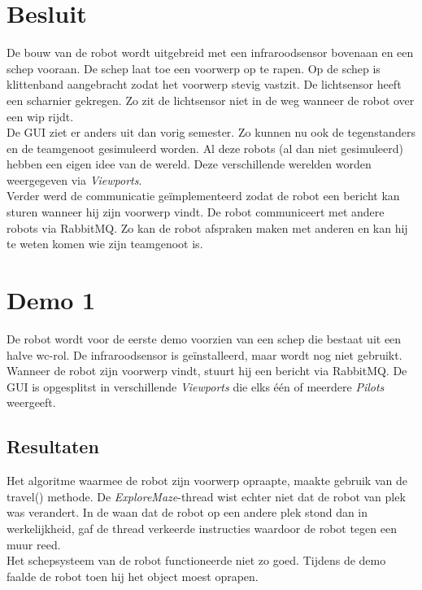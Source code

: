 \documentclass[tt2]{penoverslag}
\begin{document}
\section{Besluit}
De bouw van de robot wordt uitgebreid met een infraroodsensor bovenaan en een schep vooraan. De schep laat toe een voorwerp op te rapen. Op de schep is klittenband aangebracht zodat het voorwerp stevig vastzit. De lichtsensor heeft een scharnier gekregen. Zo zit de lichtsensor niet in de weg wanneer de robot over een wip rijdt. \\

De GUI ziet er anders uit dan vorig semester. Zo kunnen nu ook de tegenstanders en de teamgenoot gesimuleerd worden. Al deze robots (al dan niet gesimuleerd) hebben een eigen idee van de wereld. Deze verschillende werelden worden weergegeven via \textit{Viewports}.\\

Verder werd de communicatie ge\"implementeerd zodat de robot een bericht kan sturen wanneer hij zijn voorwerp vindt. 
De robot communiceert met andere robots via RabbitMQ. Zo kan de robot afspraken maken met anderen en kan hij te weten komen wie zijn teamgenoot is.
 


\newpage
\makeappendix

\section{Demo 1} %
\label{Asec:demo1}
De robot wordt voor de eerste demo voorzien van een schep die bestaat uit een halve wc-rol. De infraroodsensor is ge\"installeerd, maar wordt nog niet gebruikt. Wanneer de robot zijn voorwerp vindt, stuurt hij een bericht via RabbitMQ. De GUI is opgesplitst in verschillende \textit{Viewports} die elks \'e\'en of meerdere \textit{Pilots} weergeeft.

\subsection{Resultaten} %
\label{Assec:result1}
Het algoritme waarmee de robot zijn voorwerp opraapte, maakte gebruik van de travel() methode. De \textit{ExploreMaze}-thread wist echter niet dat de robot van plek was verandert. In de waan dat de robot op een andere plek stond dan in werkelijkheid, gaf de thread verkeerde instructies waardoor de robot tegen een muur reed. \\
Het schepsysteem van de robot functioneerde niet zo goed. Tijdens de demo faalde de robot toen hij het object moest oprapen. 
\end{document}
